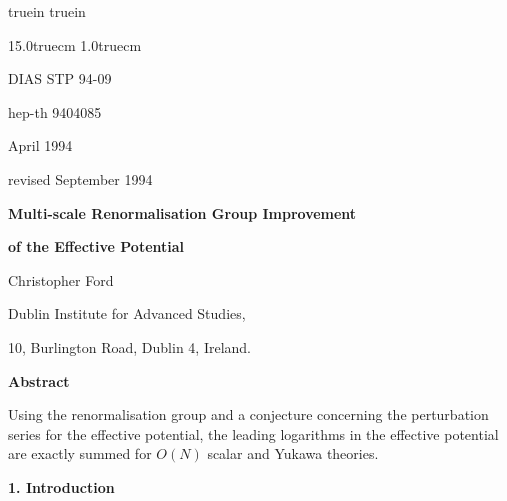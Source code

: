 \def\La{\Lambda}
\def\la{\lambda}

\def\quotesl{\lq\lq}
\def\quotesr{''}

%

\def\ref#1#2{\nref#1{#2}}
\overfullrule 0pt
\hfuzz 52pt
 truein
 truein

\loadfourteenpoint
\newcount\meqno
\newcount\secno
{}


\def\put#1{\global\edef#1{(\the\chapno.\the\secno.\the\meqno)}     }
\def\mustate{\vert\mu\ra}
\def\lastate{\vert\la\ra}
\def\hwtstate{\vert\La\ra}
\def\rank{\rm rank}
\def\initpage#1#2{
{\nopagenumbers
\hoffset 2.5 truecm \hsize 12 truecm \vskip 6.0truecm
\centerline{{\bf #1}}\bigskip
\it #2\par}\vfill\eject}


\twelvepoint
\baselineskip 24pt
\lineskip 24pt
\hsize 15.0truecm
\hoffset 1.0truecm


\def\k{\kappa}
\def\M{$\overline{\hbox{MS}}$ }
\def\O{\Omega}
\def\b{\beta}
\def\p{\phi}
\def\g{\gamma}
\def\d{\partial}
\def\pd{\d}
\def\m{\mu}
\def\l{\lambda}
\def\h{\hbox{${1\over2}$}}
\def\D{{\cal D}}
\def\L{\Lambda}
\def\R{{m^2+\h\l\p^2\over{m^2+\hbox{${1\over6}$}\l\p^2}}}
\def\f{(4\pi)^2}
\hfill DIAS STP 94-09\par
\hfill hep-th 9404085\par
\hfill April 1994\par
\hfill revised September 1994\par
\line{\hfill}
\centerline{\seventeenpoint\bf Multi-scale Renormalisation Group
Improvement}
\line{\hfill}
\centerline{\seventeenpoint\bf of the Effective Potential}
\line{\hfill}

\line{\hfill}
\line{\hfill}
\centerline{ Christopher Ford}
\line{\hfill}
\centerline{ Dublin Institute for Advanced Studies, }
\centerline{10, Burlington Road, Dublin 4, Ireland.}
\line{\hfill}
\line{\hfill}
\centerline{\fourteenpoint\bf Abstract}
\line{\hfill}
Using the renormalisation group and a conjecture concerning the
perturbation series for the effective potential, the leading
logarithms in the effective potential are exactly summed for $O(N)$
scalar and Yukawa theories.

\line{\hfill}
\line{\hfill}
\vfill\eject
\centerline{\fourteenpoint\bf 1. Introduction}
\line{\hfill}

